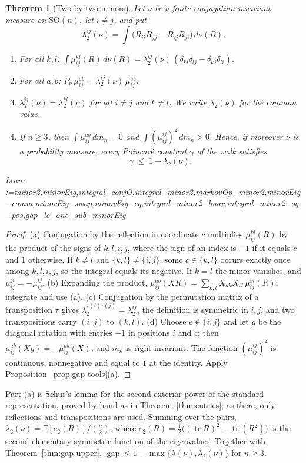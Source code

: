 \documentclass[11pt]{amsart}
\makeatletter
\newtheorem{theorem}{Theorem}[section]
\theoremstyle{definition}
\theoremstyle{remark}
\newcommand{\@leanlist}[1]{\def\@leansep{}\@for\@leanname:=#1\do{\@leansep
  \texttt{\expandafter\detokenize\expandafter{\@leanname}}\def\@leansep{, }}}
\newcommand{\lean}[1]{\par\smallskip\noindent
  {\footnotesize\normalfont\raggedright\textsf{Lean:} \@leanlist{#1}\par}}
\newcommand{\E}{\mathbb{E}}
\newcommand{\SO}{\mathrm{SO}}
\newcommand{\tr}{\operatorname{tr}}
\newcommand{\gap}{\operatorname{gap}}
\makeatother
\begin{document}
\begin{theorem}[Two-by-two minors]\label{thm:second}
Let $\nu$ be a finite conjugation-invariant measure on $\SO(n)$, let $i\ne j$, and put
\[
  \lambda_2^{ij}(\nu)=\int\bigl(R_{ii}R_{jj}-R_{ij}R_{ji}\bigr)\,d\nu(R).
\]
\begin{enumerate}
\item[(a)] For all $k,l$:
$\int\mu^{kl}_{ij}(R)\,d\nu(R)=\lambda_2^{ij}(\nu)\,(\delta_{ki}\delta_{lj}-\delta_{kj}\delta_{li})$.
\item[(b)] For all $a,b$: $P_\nu\,\mu^{ab}_{ij}=\lambda_2^{ij}(\nu)\,\mu^{ab}_{ij}$.
\item[(c)] $\lambda_2^{ij}(\nu)=\lambda_2^{kl}(\nu)$ for all $i\ne j$ and $k\ne l$.  We write
$\lambda_2(\nu)$ for the common value.
\item[(d)] If $n\ge3$, then $\int\mu^{ab}_{ij}\,dm_n=0$ and $\int(\mu^{ij}_{ij})^2\,dm_n>0$.
Hence, if moreover $\nu$ is a probability measure, every Poincar\'e constant $\gamma$ of the
walk satisfies
\[
  \gamma\;\le\;1-\lambda_2(\nu).
\]
\end{enumerate}
\lean{minor2,minorEig,integral_conjO,integral_minor2,markovOp_minor2,minorEig_comm,minorEig_swap,minorEig_eq,integral_minor2_haar,integral_minor2_sq_pos,gap_le_one_sub_minorEig}
\end{theorem}

\begin{proof}
(a) Conjugation by the reflection in coordinate $c$ multiplies $\mu^{kl}_{ij}(R)$ by the product
of the signs of $k,l,i,j$, where the sign of an index is $-1$ if it equals $c$ and $1$
otherwise.  If $k\ne l$ and $\{k,l\}\ne\{i,j\}$, some $c\in\{k,l\}$ occurs exactly once among
$k,l,i,j$, so the integral equals its negative.  If $k=l$ the minor vanishes, and
$\mu^{ji}_{ij}=-\mu^{ij}_{ij}$.  (b) Expanding the product,
$\mu^{ab}_{ij}(XR)=\sum_{k,l}X_{ak}X_{bl}\,\mu^{kl}_{ij}(R)$; integrate and use (a).  (c)
Conjugation by the permutation matrix of a transposition $\tau$ gives
$\lambda_2^{\tau(i)\tau(j)}=\lambda_2^{ij}$, the definition is symmetric in $i,j$, and two
transpositions carry $(i,j)$ to $(k,l)$.  (d) Choose $c\notin\{i,j\}$ and let
$g$ be the diagonal rotation with entries $-1$ in positions $i$ and $c$; then
$\mu^{ab}_{ij}(Xg)=-\mu^{ab}_{ij}(X)$, and $m_n$ is right invariant.  The function
$(\mu^{ij}_{ij})^2$ is continuous, nonnegative and equal to $1$ at the identity.  Apply
Proposition~\ref{prop:gap-tools}(a).
\end{proof}

Part (a) is Schur's lemma for the second exterior power of the standard representation, proved
by hand as in Theorem~\ref{thm:entries}; as there, only reflections and transpositions are used.
Summing over the pairs, $\lambda_2(\nu)=\E[e_2(R)]/\binom n2$, where
$e_2(R)=\tfrac12\bigl((\tr R)^2-\tr(R^2)\bigr)$ is the second elementary symmetric function of the
eigenvalues.  Together with Theorem~\ref{thm:gap-upper},
$\gap\le1-\max\{\lambda(\nu),\lambda_2(\nu)\}$ for $n\ge3$.
\end{document}
